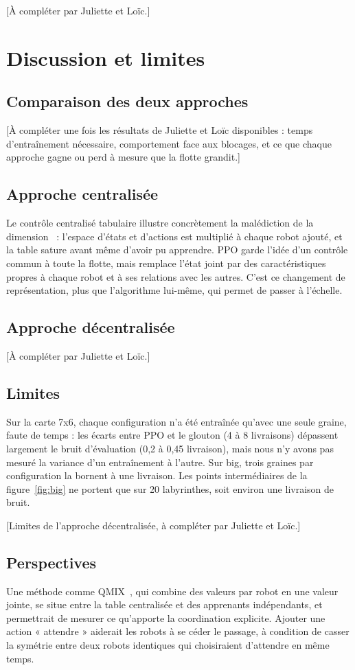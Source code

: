 \documentclass[11pt,a4paper]{article}
\begin{document}
[À compléter par Juliette et Loïc.]

\section{Discussion et limites}

\subsection{Comparaison des deux approches}
[À compléter une fois les résultats de Juliette et Loïc disponibles : temps d'entraînement nécessaire, comportement face aux blocages, et ce que chaque approche gagne ou perd à mesure que la flotte grandit.]

\subsection{Approche centralisée}
Le contrôle centralisé tabulaire illustre concrètement la malédiction de la dimension~\cite{bellman1957} : l'espace d'états et d'actions est multiplié à chaque robot ajouté, et la table sature avant même d'avoir pu apprendre. PPO garde l'idée d'un contrôle commun à toute la flotte, mais remplace l'état joint par des caractéristiques propres à chaque robot et à ses relations avec les autres. C'est ce changement de représentation, plus que l'algorithme lui-même, qui permet de passer à l'échelle.

\subsection{Approche décentralisée}
[À compléter par Juliette et Loïc.]

\subsection{Limites}
Sur la carte 7x6, chaque configuration n'a été entraînée qu'avec une seule graine, faute de temps : les écarts entre PPO et le glouton (4 à 8 livraisons) dépassent largement le bruit d'évaluation (0,2 à 0,45 livraison), mais nous n'y avons pas mesuré la variance d'un entraînement à l'autre. Sur big, trois graines par configuration la bornent à une livraison. Les points intermédiaires de la figure~\ref{fig:big} ne portent que sur 20 labyrinthes, soit environ une livraison de bruit.

[Limites de l'approche décentralisée, à compléter par Juliette et Loïc.]

\subsection{Perspectives}
Une méthode comme QMIX~\cite{rashid2018}, qui combine des valeurs par robot en une valeur jointe, se situe entre la table centralisée et des apprenants indépendants, et permettrait de mesurer ce qu'apporte la coordination explicite. Ajouter une action « attendre » aiderait les robots à se céder le passage, à condition de casser la symétrie entre deux robots identiques qui choisiraient d'attendre en même temps.
\end{document}
